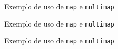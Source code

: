 \begin{frame}[fragile]{Exemplo de uso de \texttt{map} e \texttt{multimap}}
\end{frame}

\begin{frame}[fragile]{Exemplo de uso de \texttt{map} e \texttt{multimap}}
\end{frame}

\begin{frame}[fragile]{Exemplo de uso de \texttt{map} e \texttt{multimap}}
\end{frame}
